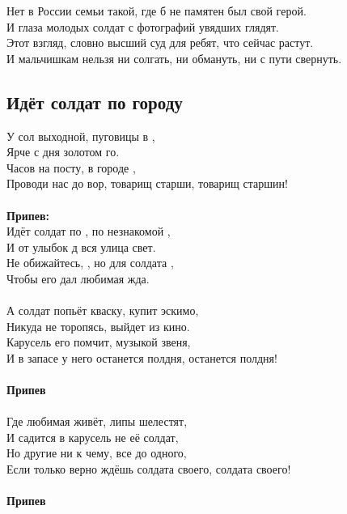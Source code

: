 \documentclass[fleqn,a5paper,12pt,twoside]{guitartabs}
\begin{document}
    Нет в России семьи такой, где б не памятен был свой герой.\\
    И глаза молодых солдат с фотографий увядших глядят.\\
    Этот взгляд, словно высший суд для ребят, что сейчас растут.\\
    И мальчишкам нельзя ни солгать, ни обмануть, ни с пути \mbox{свернуть.}\\
\newpage
{}%
\subsection*{Идёт солдат по городу}
    У сол выходной, пуговицы в ,\\
    Ярче с дня золотом го.\\
    Часов на посту, в городе ,\\
    Проводи нас до вор, товарищ старши, товарищ старшин!\\
    \\
    \-\hspace{10mm}\textbf{Припев:}\\
    \-\hspace{10mm}Идёт солдат по , по незнакомой , \\
    \-\hspace{10mm}И от улыбок д вся улица свет.\\
    \-\hspace{10mm}Не обижайтесь, , но для солдата ,      \\
    \-\hspace{10mm}Чтобы его дал любимая жда.\\
    \\
    А солдат попьёт кваску, купит эскимо,\\
    Никуда не торопясь, выйдет из кино.\\
    Карусель его помчит, музыкой звеня,\\
    И в запасе у него останется полдня, останется полдня!\\
    \\
    \-\hspace{10mm}\textbf{Припев}\\
    \\
    Где любимая живёт, липы шелестят,\\
    И садится в карусель не её солдат,\\
    Но другие ни к чему, все до одного,\\
    Если только верно ждёшь солдата своего, солдата своего!\\
    \\
    \-\hspace{10mm}\textbf{Припев}\\
\newpage
{}%
\end{document}
